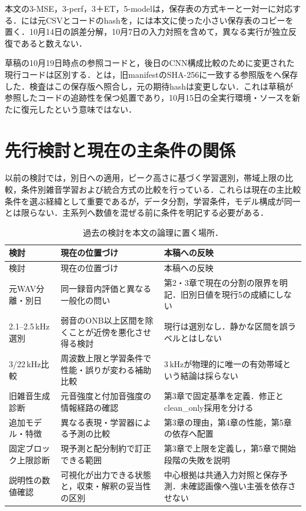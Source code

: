 本文の3-MSE，3-perf，3＋ET，5-modelは，保存表の方式キーと一対一に対応する．には元CSVとコードのhashを，には本文に使った小さい保存表のコピーを置く．10月14日の誤差分解，10月7日の入力対照を含めて，異なる実行が独立反復であると数えない．

草稿の10月19日時点の参照コードと，後日のCNN構成比較のために変更された現行コードは区別する．とは，旧manifestのSHA-256に一致する参照版をへ保存した．検査はこの保存版へ照合し，元の期待hashは変更しない．これは草稿が参照したコードの追跡性を保つ処置であり，10月15日の全実行環境・ソースを新たに復元したという意味ではない．


\section{先行検討と現在の主条件の関係}
以前の検討では，別日への適用，ピーク高さに基づく学習選別，帯域上限の比較，条件別雑音学習および統合方式の比較を行っている．これらは現在の主比較条件を選ぶ経緯として重要であるが，データ分割，学習条件，モデル構成が同一とは限らない．主系列へ数値を混ぜる前に条件を明記する必要がある．

\begin{longtable}{L{31mm}L{48mm}L{50mm}}
\caption{過去の検討を本文の論理に置く場所．}\\
\toprule 検討 & 現在の位置づけ & 本稿への反映 \\ \midrule\endfirsthead
\toprule 検討 & 現在の位置づけ & 本稿への反映 \\ \midrule\endhead
元WAV分離・別日 & 同一録音内評価と異なる一般化の問い & 第2・3章で現在の分割の限界を明記．旧別日値を現行5の成績にしない \\
2.1--2.5\,kHz選別 & 弱音のONB以上区間を除くことが近傍を悪化させ得る検討 & 現行は選別なし．静かな区間を誤ラベルとはしない \\
3/22\,kHz比較 & 周波数上限と学習条件で性能・誤りが変わる補助比較 & 3\,kHzが物理的に唯一の有効帯域という結論は採らない \\
旧雑音生成診断 & 元音強度と付加音強度の情報経路の確認 & 第3章で固定基準を定義．修正とclean\_only採用を分ける \\
追加モデル・特徴 & 異なる表現・学習器による予測の比較 & 第3章の理由，第4章の性能，第5章の依存へ配置 \\
固定ブロック上限診断 & 現予測と配分制約で訂正できる範囲 & 第3章で上限を定義し，第5章で開始段階の失敗を説明 \\
説明性の数値確認 & 可視化が出力できる状態と，収束・解釈の妥当性の区別 & 中心根拠は共通入力対照と保存予測．未確認画像へ強い主張を依存させない \\
\bottomrule
\end{longtable}

